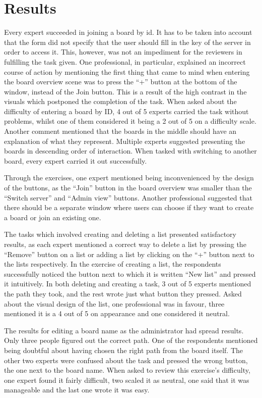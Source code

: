 \section{Results}

Every expert succeeded in joining a board by id. It has to be taken into account that the form did not specify that the user should fill in the key of the server in order to access it. This, however, was not an impediment for the reviewers in fulfilling the task given. One professional, in particular,  explained an incorrect course of action by mentioning the first thing that came to mind when entering the board overview scene was to press the “+” button at the bottom of the window, instead of the Join button. This is a result of the high contrast in the visuals which postponed the completion of the task. When asked about the difficulty of entering a board by ID, 4 out of 5 experts carried the task without problems, whilst one of them considered it being a 2 out of 5 on a difficulty scale. Another comment mentioned that the boards in the middle should have an explanation of what they represent. Multiple experts suggested presenting the boards in descending order of interaction. When tasked with switching to another board, every expert carried it out successfully.

Through the exercises, one expert mentioned being inconvenienced by the design of the buttons, as the “Join” button in the board overview was smaller than the “Switch server” and “Admin view” buttons. Another professional suggested that there should be a separate window where users can choose if they want to create a board or join an existing one.

The tasks which involved creating and deleting a list presented satisfactory results, as each expert mentioned a correct way to delete a list by pressing the “Remove” button on a list or adding a list by clicking on the “+” button next to the lists respectively. In the exercise of creating a list, the respondents successfully noticed the button next to which it is written “New list” and pressed it intuitively. In both deleting and creating a task, 3 out of 5 experts mentioned the path they took, and the rest wrote just what button they pressed. Asked about the visual design of the list, one professional was in favour, three mentioned it is a 4 out of 5 on appearance and one considered it neutral.

The results for editing a board name as the administrator had spread results. Only three people figured out the correct path. One of the respondents mentioned being doubtful about having chosen the right path from the board itself. The other two experts were confused about the task and pressed the wrong button, the one next to the board name. When asked to review this exercise’s difficulty, one expert found it fairly difficult, two scaled it as neutral, one said that it was manageable and the last one wrote it was easy.

